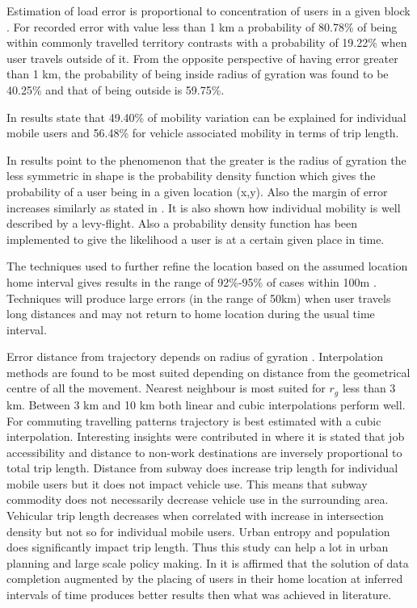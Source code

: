 \documentclass[12pt, a4paper]{report}
\theoremstyle{definition}
\theoremstyle{definition}%
\theoremstyle{definition}%
\theoremstyle{definition}%
\theoremstyle{definition}%
\theoremstyle{definition}%
\begin{document}
Estimation of load error is proportional to concentration of users in a given block \cite{Hoteit2014}. For recorded error with value less than 1 km a probability of 80.78\% of being within commonly travelled territory contrasts with a probability of 19.22\% when user travels outside of it. From the opposite perspective of having error greater than 1 km, the probability of being inside radius of gyration was found to be 40.25\% and that of being outside is 59.75\%.

In \cite{Calabrese2013} results state that 49.40\% of mobility variation can be explained for individual mobile users and 56.48\% for vehicle associated mobility in terms of trip length.    

In \cite{Gonzalez2008} results point to the phenomenon that the greater is the radius of gyration the less symmetric in shape is the probability density function which gives the probability of a user being in a given location (x,y). Also the margin of error increases similarly as stated in \cite{Hoteit2014}. It is also shown how individual mobility is well described by a levy-flight. Also a probability density function has been implemented to give the likelihood a user is at a certain given place in time.

The techniques used to further refine the location based on the assumed location home interval gives results in the range of 92\%-95\% of cases within 100m \cite{Hoteit2016}. Techniques will produce large errors (in the range of 50km) when user travels long distances and may not return to home location during the usual time interval.

Error distance from trajectory depends on radius of gyration \cite{Hoteit2014}. Interpolation methods are found to be most suited depending on distance from the geometrical centre of all the movement. Nearest neighbour is most suited for $r_{g}$ less than 3 km. Between 3 km and 10 km both linear and cubic interpolations perform well. For commuting travelling patterns trajectory is best estimated with a cubic interpolation.
Interesting insights were contributed in \cite{Calabrese2013} where it is stated that job accessibility and distance to non-work destinations are inversely proportional to total trip length. Distance from subway does increase trip length for individual mobile users but it does not impact vehicle use. This means that subway commodity does not necessarily decrease vehicle use in the surrounding area. Vehicular trip length decreases when correlated with increase in intersection density but not so for individual mobile users. Urban entropy and population does significantly impact trip length. Thus this study can help a lot in urban planning and large scale policy making.
In \cite{Hoteit2016} it is affirmed that the solution of data completion augmented by the placing of users in their home location at inferred intervals of time produces better results then what was achieved in literature.
\end{document}
